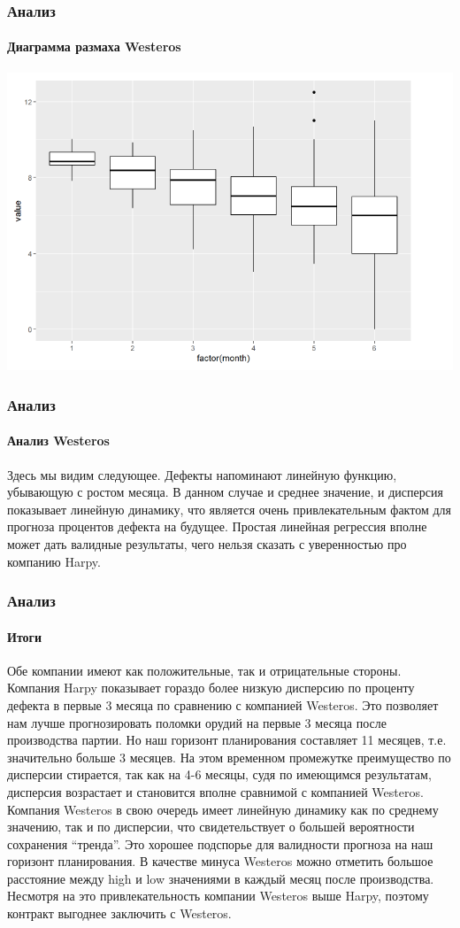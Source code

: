 \documentclass{beamer}
\begin{document}
\begin{frame}
\begin{flushleft}
\frametitle{Анализ}
\framesubtitle{Диаграмма размаха Westeros}
\end{flushleft}
\includegraphics[width=1\linewidth]{images/image5.png}
\end{frame}

\begin{frame}
\begin{flushleft}
\frametitle{Анализ}
\framesubtitle{Анализ Westeros}
\small{Здесь мы видим следующее. Дефекты напоминают линейную функцию, убывающую с ростом месяца. В данном случае и среднее значение, и дисперсия показывает линейную динамику, что является очень привлекательным фактом для прогноза процентов дефекта на 
будущее. Простая линейная регрессия вполне может дать валидные результаты, 
чего нельзя сказать с уверенностью про компанию Harpy.}
\end{flushleft}
\end{frame}

\begin{frame}
\begin{flushleft}
\frametitle{Анализ}
\framesubtitle{Итоги}
\small{Обе компании имеют как положительные, так и отрицательные стороны. Компания Harpy показывает гораздо более низкую дисперсию по проценту дефекта в первые 3 месяца по сравнению с компанией Westeros. Это позволяет нам лучше прогнозировать поломки орудий на первые 3 месяца после производства партии. Но наш горизонт планирования составляет 11 месяцев, т.е. значительно больше 3 месяцев. На этом временном промежутке преимущество по дисперсии стирается, так как на 4-6 месяцы, судя по имеющимся результатам, дисперсия возрастает и становится вполне сравнимой с компанией Westeros. Компания Westeros в свою очередь имеет линейную динамику как по среднему значению, так и по дисперсии, что свидетельствует о большей вероятности сохранения “тренда”. Это хорошее подспорье для валидности прогноза на наш горизонт планирования. В качестве минуса Westeros можно отметить большое расстояние между high и low значениями в каждый месяц после производства. Несмотря на это привлекательность компании Westeros выше Harpy, поэтому контракт выгоднее заключить с Westeros.}
\end{flushleft}
\end{frame}
\end{document}
